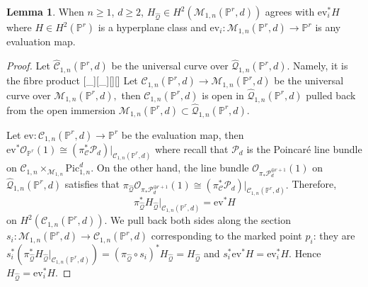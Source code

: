\documentclass[12pt,reqno]{amsart}
\theoremstyle{definition}
\theoremstyle{definition}
\theoremstyle{definition}
\theoremstyle{definition}
\newtheorem{lemma}[theorem]{Lemma}
\newcommand{\textred}[1]{\textcolor{red}{#1}}
\begin{document}
\begin{lemma}
  When $n\geq 1$, $d\geq 2$, $H_{\hat{\mathcal{Q}}}\in H^2(\mathcal{M}_{1,n}(\mathbb{P}^r,d))$ agrees with $\mathrm{ev}_{i}^*H$ where $H\in H^2(\mathbb{P}^r)$ is a hyperplane class and $\mathrm{ev}_{i}: \mathcal{M}_{1,n}(\mathbb{P}^r,d)\to \mathbb{P}^r$ is any evaluation map.
\end{lemma}
\begin{proof}
  Let $\hat{\mathcal{C}}_{1,n}(\mathbb{P}^r,d)$ be the universal curve over $\hat{\mathcal{Q}}_{1,n}(\mathbb{P}^r,d).$ Namely, it is the fibre product [\pi_{}][\pi_{{}}][][] Let $\mathcal{C}_{1,n}(\mathbb{P}^r,d)\to \mathcal{M}_{1,n}(\mathbb{P}^r,d)$ be the universal curve over $\mathcal{M}_{1,n}(\mathbb{P}^r,d),$ then $\mathcal{C}_{1,n}(\mathbb{P}^r,d)$ is open in $\hat{\mathcal{Q}}_{1,n}(\mathbb{P}^r,d)$ pulled back from the open immersion $\mathcal{M}_{1,n}(\mathbb{P}^r,d)\subset \hat{\mathcal{Q}}_{1,n}(\mathbb{P}^r,d).$ 
  
  Let $\mathrm{ev}: \mathcal{C}_{1,n}(\mathbb{P}^r,d)\to \mathbb{P}^r$ be the evaluation map, then $\mathrm{ev}^*\mathcal{O}_{\mathbb{P}^r}(1)\cong (\pi_{{\mathcal{C}}}^* \mathcal{P}_d)|_{\mathcal{C}_{1,n}(\mathbb{P}^r,d)}$ where recall that $\mathcal{P}_d$ is the Poincaré line bundle on $\mathcal{C}_{1,n}\times_{\mathcal{M}_{1,n}}\mathrm{Pic}^d_{1,n}.$ On the other hand, the line bundle $\mathcal{O}_{\pi_*\mathcal{P}_d^{\oplus r+1}}(1)$ on $\hat{\mathcal{Q}}_{1,n}(\mathbb{P}^r,d)$ satisfies that $\pi_{\hat{\mathcal{Q}}}\mathcal{O}_{\pi_*\mathcal{P}_d^{\oplus r+1}}(1)\cong (\pi_{{\mathcal{C}}}^* \mathcal{P}_d)|_{\mathcal{C}_{1,n}(\mathbb{P}^r,d)}.$ %
  Therefore, $$\pi_{\hat{\mathcal{Q}}}^* H_{\hat{\mathcal{Q}}}|_{\mathcal{C}_{1,n}(\mathbb{P}^r,d)} = \mathrm{ev}^* H$$ on $H^2(\mathcal{C}_{1,n}(\mathbb{P}^r,d)).$ We pull back both sides along the section $s_i: \mathcal{M}_{1,n}(\mathbb{P}^r,d)\to \mathcal{C}_{1,n}(\mathbb{P}^r,d)$ corresponding to the marked point $p_i$: they are $s_i^*(\pi_{\hat{\mathcal{Q}}}^* H_{\hat{\mathcal{Q}}}|_{\mathcal{C}_{1,n}(\mathbb{P}^r,d)}) = (\pi_{\hat{\mathcal{Q}}}\circ s_i)^* H_{\hat{\mathcal{Q}}} = H_{\hat{\mathcal{Q}}}$ and $s_i^* \mathrm{ev}^* H = \mathrm{ev}_i^*H.$ Hence $H_{\hat{\mathcal{Q}}} = \mathrm{ev}_i^*H.$
\end{proof}
\end{document}
